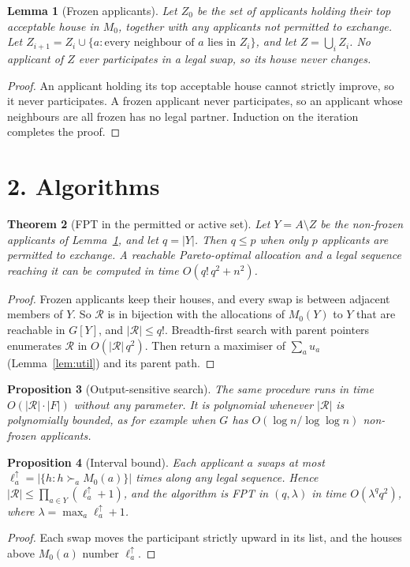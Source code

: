\documentclass[11pt]{article}
\newtheorem{theorem}{Theorem}
\newtheorem{proposition}[theorem]{Proposition}
\newtheorem{lemma}[theorem]{Lemma}
\theoremstyle{definition}
\begin{document}
\begin{lemma}[Frozen applicants]\label{lem:frozen}
Let $Z_0$ be the set of applicants holding their top acceptable house in $M_0$, together with any applicants not permitted
to exchange. Let $Z_{i+1}=Z_i\cup\{a:\text{every neighbour of }a\text{ lies in }Z_i\}$, and let $Z=\bigcup_iZ_i$. No
applicant of $Z$ ever participates in a legal swap, so its house never changes.
\end{lemma}
\begin{proof}
An applicant holding its top acceptable house cannot strictly improve, so it never participates. A frozen applicant never
participates, so an applicant whose neighbours are all frozen has no legal partner. Induction on the iteration completes
the proof.
\end{proof}

\section*{2. Algorithms}
\begin{theorem}[FPT in the permitted or active set]\label{thm:fpt}
Let $Y=A\setminus Z$ be the non-frozen applicants of Lemma~\ref{lem:frozen}, and let $q=|Y|$. Then $q\le p$ when
only $p$ applicants are permitted to exchange. A reachable Pareto-optimal allocation and a legal sequence reaching it can be
computed in time $O(q!\,q^2+n^2)$.
\end{theorem}
\begin{proof}
Frozen applicants keep their houses, and every swap is between adjacent members of $Y$. So $\mathcal R$ is in bijection
with the allocations of $M_0(Y)$ to $Y$ that are reachable in $G[Y]$, and $|\mathcal R|\le q!$. Breadth-first search with
parent pointers enumerates $\mathcal R$ in $O(|\mathcal R|\,q^2)$. Then return a maximiser of $\sum_au_a$
(Lemma~\ref{lem:util}) and its parent path.
\end{proof}

\begin{proposition}[Output-sensitive search]\label{prop:out}
The same procedure runs in time $O(|\mathcal R|\cdot|F|)$ without any parameter. It is polynomial whenever
$|\mathcal R|$ is polynomially bounded, as for example when $G$ has $O(\log n/\log\log n)$ non-frozen applicants.
\end{proposition}

\begin{proposition}[Interval bound]\label{prop:interval}
Each applicant $a$ swaps at most $\ell_a^{\uparrow}=|\{h:h\succ_aM_0(a)\}|$ times along any legal sequence. Hence
$|\mathcal R|\le\prod_{a\in Y}(\ell_a^{\uparrow}+1)$, and the algorithm is FPT in $(q,\lambda)$ in time
$O(\lambda^{q}q^2)$, where $\lambda=\max_a\ell_a^{\uparrow}+1$.
\end{proposition}
\begin{proof}
Each swap moves the participant strictly upward in its list, and the houses above $M_0(a)$ number $\ell_a^{\uparrow}$.
\end{proof}
\end{document}
